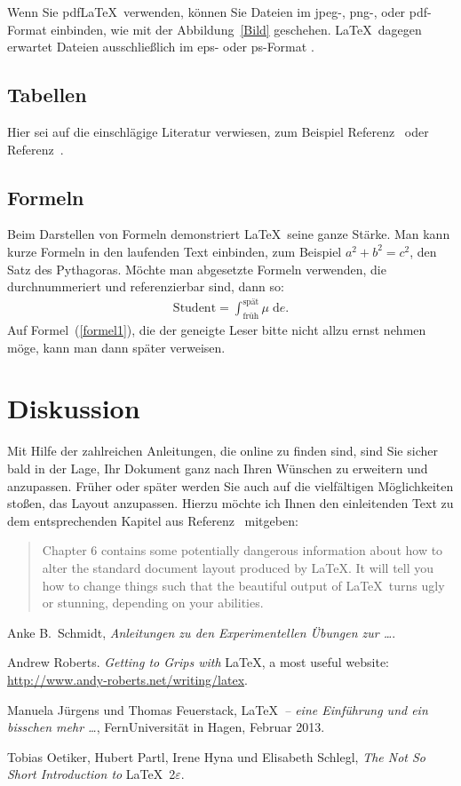 \documentclass[
	fontsize=11pt,
	paper=a4,
	pagesize=auto,
	parskip=false,
	titlepage=on,
	ngerman
]{scrartcl}
\begin{document}
Wenn Sie pdf\LaTeX\ verwenden, können Sie Dateien im jpeg-, png-, oder pdf-Format einbinden, wie mit der Abbildung~\ref{Bild} geschehen. \LaTeX\ dagegen erwartet Dateien ausschließlich im eps- oder ps-Format \cite{andyroberts}.

\subsection{Tabellen}

Hier sei auf die einschlägige Literatur verwiesen, zum Beispiel Referenz~\cite{andyroberts} oder Referenz~\cite{hobbits}.

\subsection{Formeln}

Beim Darstellen von Formeln demonstriert \LaTeX\ seine ganze Stärke. Man kann kurze Formeln in den laufenden Text einbinden, zum Beispiel $a^2+b^2=c^2$, den Satz des Pythagoras. Möchte man abgesetzte Formeln verwenden, die durchnummeriert und referenzierbar sind, dann so:
%
\begin{align}\label{formel1}
	\textrm{Student}=\int_\textrm{früh}^\textrm{spät} \mu \; \mathrm{d}e.
\end{align}
%
Auf Formel~(\ref{formel1}), die der geneigte Leser bitte nicht allzu ernst nehmen möge, kann man dann später verweisen.

\section{Diskussion}

Mit Hilfe der zahlreichen Anleitungen, die online zu finden sind, sind Sie sicher bald in der Lage, Ihr Dokument ganz nach Ihren Wünschen zu erweitern und anzupassen. Früher oder später werden Sie auch auf die vielfältigen Möglichkeiten stoßen, das Layout anzupassen. Hierzu möchte ich Ihnen den einleitenden Text zu dem entsprechenden Kapitel aus Referenz~\cite{lshort} mitgeben:
\begin{quote} Chapter 6 contains some potentially dangerous information about how to alter the standard document layout produced by \LaTeX. It will tell you how to change things such that the beautiful output of \LaTeX\ turns ugly or stunning, depending on your abilities.\end{quote}

\begin{thebibliography}{9}

 Anke B.~Schmidt, \emph{Anleitungen zu den Experimentellen Übungen zur \ldots}.

 Andrew Roberts. \emph{Getting to Grips with} \LaTeX, a most useful website: \url{http://www.andy-roberts.net/writing/latex}.

 Manuela Jürgens und Thomas Feuerstack, \LaTeX\ \emph{-- eine Einführung und ein bisschen mehr \ldots}, FernUniversität in Hagen, Februar 2013.

 Tobias Oetiker, Hubert Partl, Irene Hyna und Elisabeth Schlegl, \emph{The Not So Short Introduction to} \LaTeX\ 2$\varepsilon$.

\end{thebibliography}
\end{document}
